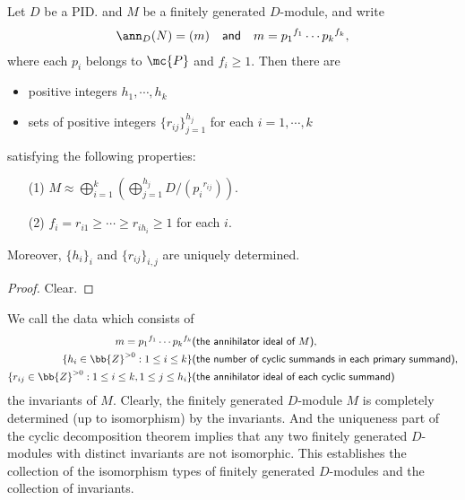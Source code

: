 \begin{thm}\label{CDT 1-2}
    Let $D$ be a PID. and $M$ be a finitely generated $D$-module, and write
    \begin{align*}
        \ann_D(N)=(m)\quad\textsf{and}\quad m={p_1}^{f_1}\cdots{p_k}^{f_k},
    \end{align*}
    where each $p_i$ belongs to $\mc{P}$ and $f_i\geq 1$.
    Then there are
    \begin{itemize}
        \item
        {
            positive integers $h_1, \cdots, h_k$
        }
        \item
        {
            sets of positive integers $\{r_{ij}\}_{j=1}^{h_j}$ for each $i=1, \cdots, k$
        }
    \end{itemize}
    satisfying the following properties:
    \begin{enumerate}
        \item[(1)]
        {
            $M\approx\bigoplus_{i=1}^k\left(\bigoplus_{j=1}^{h_j} D/({p_i}^{r_{ij}})\right)$.
        }
        \item[(2)]
        {
            $f_i = r_{i1} \geq\cdots\geq r_{ih_i}\geq 1$ for each $i$.
        }
    \end{enumerate}
    Moreover, $\{h_i\}_i$ and $\{r_{ij}\}_{i, j}$ are uniquely determined.
\end{thm}
\begin{proof}
    Clear.
\end{proof}

We call the data which consists of
\begin{eqnarray*}
    m={p_1}^{f_1}\cdots{p_k}^{f_k}&\textsf{(the annihilator ideal of $M$)},\\
    \{h_i\in\bb{Z}^{>0}: 1\leq i\leq k\}&\textsf{(the number of cyclic summands in each primary summand)},\\
    \{r_{ij}\in\bb{Z}^{>0}: 1\leq i\leq k, 1\leq j\leq h_i\}&\textsf{(the annihilator ideal of each cyclic summand)}
\end{eqnarray*}
the invariants of $M$.
Clearly, the finitely generated $D$-module $M$ is completely determined (up to isomorphism) by the invariants.
And the uniqueness part of the cyclic decomposition theorem implies that any two finitely generated $D$-modules with distinct invariants are not isomorphic.
This establishes the collection of the isomorphism types of finitely generated $D$-modules and the collection of invariants.

